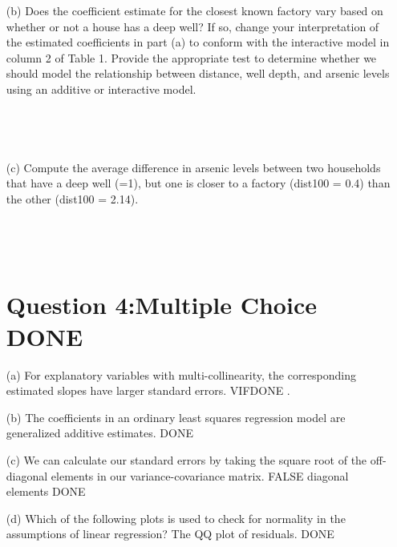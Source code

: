 \documentclass[12pt,letterpaper]{article}
\begin{document}
{\begin{enumerate}
\begin{verbatim}
			
			
		\end{verbatim}
		\item [(b)] Does the coefficient estimate for the closest known factory vary based on whether or not
		a house has a deep well? If so, change your interpretation of the estimated coefficients
		in part (a) to conform with the interactive model in column 2 of Table 1. Provide
		the appropriate test to determine whether we should model the relationship between
		distance, well depth, and arsenic levels using an additive or interactive model.

		
		\begin{verbatim}
			
			
			
		\end{verbatim}
	\item [(c)] Compute the average difference in arsenic levels between two households that have a
	deep well (=1), but one is closer to a factory (dist100 = 0.4) than the other (dist100 =
	2.14).
	
	\begin{verbatim}
		
		
		
	\end{verbatim}
\newpage
\section*{Question 4:Multiple Choice DONE}
\item [(a)] For explanatory variables with multi-collinearity, the corresponding estimated slopes have
larger standard errors.
VIFDONE .

\item [(b)] The coefficients in an ordinary least squares regression model are generalized additive estimates.
DONE 

\item [(c)] We can calculate our standard errors by taking the square root of the off-diagonal elements
in our variance-covariance matrix.
FALSE
 diagonal elements DONE

\item [(d)] Which of the following plots is used to check for normality in the assumptions of linear
regression?
The QQ plot of residuals.
DONE
 
	\vspace{.5cm}
	\newpage

\end{enumerate}}
\end{document}
